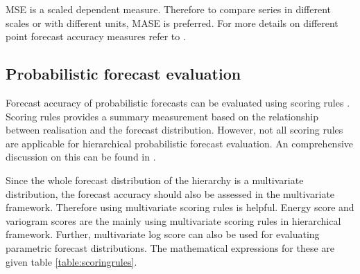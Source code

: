 \documentclass[graybox]{svmult}
\begin{document}
MSE is a scaled dependent measure. Therefore to compare series in different scales or with different units, MASE is preferred. For more details on different point forecast accuracy measures refer to \cite{hyndman2018forecasting}.

\subsection{Probabilistic forecast evaluation}

Forecast accuracy of probabilistic forecasts can be evaluated using scoring rules \cite{Gneiting2014}. Scoring rules provides a summary measurement based on the relationship between realisation and the forecast distribution. However, not all scoring rules are applicable for hierarchical probabilistic forecast evaluation. An comprehensive discussion on this can be found in \cite{Gamakumara2018}.

Since the whole forecast distribution of the hierarchy is a multivariate distribution, the forecast accuracy should also be assessed in the multivariate framework. Therefore using multivariate scoring rules is helpful. Energy score \citep{Gneiting2008} and variogram scores \citep{SCHEUERER2015} are the mainly using multivariate scoring rules in hierarchical framework. Further, multivariate log score \citep{Gneiting2007} can also be used for evaluating parametric forecast distributions. The mathematical expressions for these are given table \ref{table:scoringrules}.
\end{document}
